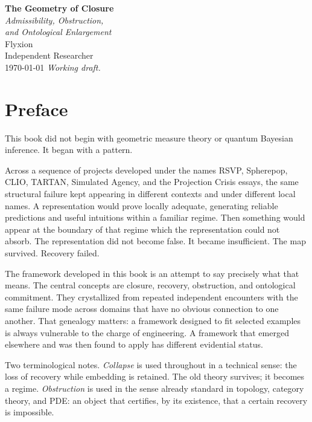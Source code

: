 \documentclass[12pt,oneside]{book}
\theoremstyle{plain}
\theoremstyle{definition}
\theoremstyle{remark}
\begin{document}
\frontmatter

\begin{titlepage}
\centering\vspace*{2.2cm}
{\Huge\bfseries The Geometry of Closure}\\[1.1em]
{\Large\itshape Admissibility, Obstruction,\\[0.3em]and Ontological Enlargement}\\[3.2em]
{\large Flyxion}\\[0.5em]
{\normalsize Independent Researcher}\\[4em]
{\normalsize \today}
\vfill
{\small\itshape Working draft.}
\end{titlepage}

\chapter*{Preface}

This book did not begin with geometric measure theory or quantum Bayesian
inference. It began with a pattern.

Across a sequence of projects developed under the names RSVP, Spherepop,
CLIO, TARTAN, Simulated Agency, and the Projection Crisis essays, the same
structural failure kept appearing in different contexts and under different
local names. A representation would prove locally adequate, generating reliable
predictions and useful intuitions within a familiar regime. Then something
would appear at the boundary of that regime which the representation could not
absorb. The representation did not become false. It became insufficient.
The map survived. Recovery failed.

The framework developed in this book is an attempt to say precisely what
that means. The central concepts are closure, recovery, obstruction, and
ontological commitment. They crystallized from repeated independent encounters
with the same failure mode across domains that have no obvious connection
to one another. That genealogy matters: a framework designed to fit selected
examples is always vulnerable to the charge of engineering. A framework that
emerged elsewhere and was then found to apply has different evidential status.

Two terminological notes. \emph{Collapse} is used throughout in a technical
sense: the loss of recovery while embedding is retained. The old theory
survives; it becomes a regime. \emph{Obstruction} is used in the sense
already standard in topology, category theory, and PDE: an object that
certifies, by its existence, that a certain recovery is impossible.
\end{document}
